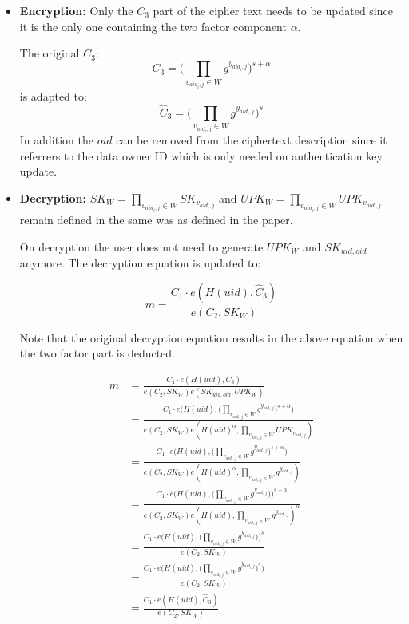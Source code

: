 \begin{itemize}
\item \textbf{Encryption:} 
Only the $C_3$ part of the cipher text needs to be updated since it is the only one containing the two factor component $\alpha$.

The original $C_3$:
$$
C_3 = \Big( \prod_{v_{aid_{i}, j}\in W} g^{y_{aid_{i}, j}} \Big)^{s + \alpha} 
$$
is adapted to:
$$
\widehat{C}_3 = \Big( \prod_{v_{aid_{i}, j}\in W} g^{y_{aid_{i}, j}} \Big)^s
$$ 
In addition the $oid$ can be removed from the ciphertext description since it referrers to the data owner ID which is only needed on authentication key update.

\item \textbf{Decryption:}
$SK_W = \prod_{v_{aid_i,j} \in W} SK_{v_{aid_i,j}}$ and $UPK_W = \prod_{v_{aid_i,j} \in W} UPK_{v_{aid_i,j}}$ remain defined in the same was as defined in the paper. 

On decryption the user does not need to generate $UPK_W$ and $SK_{uid, oid}$ anymore. The decryption equation is updated to:

$$
m = \frac{C_1 \cdotp e(H(uid), \widehat{C}_3)}{e(C_2, SK_W)}
$$

Note that the original decryption equation results in the above equation when the two factor part is deducted.

\begin{equation}
\begin{split}
m &= \frac{C_1 \cdotp e(H(uid), C_3)}{e(C_2, SK_W)e(SK_{uid, oid}, UPK_W)} \\
  &= \frac{C_1 \cdotp e\Big(H(uid), \Big( \prod_{v_{aid_{i}, j}\in W} g^{y_{aid_{i}, j}} \Big)^{s + \alpha} \Big)}{e(C_2, SK_W)e(H(uid)^\alpha, \prod_{v_{aid_i,j} \in W} UPK_{v_{aid_i,j}})} \\
  &= \frac{C_1 \cdotp e\Big(H(uid), \Big( \prod_{v_{aid_{i}, j}\in W} g^{y_{aid_{i}, j}} \Big)^{s + \alpha} \Big)}{e(C_2, SK_W)e(H(uid)^\alpha, \prod_{v_{aid_i,j} \in W} g^{y_{aid_i,j}})} \\
  &= \frac{C_1 \cdotp e\Big(H(uid), \Big( \prod_{v_{aid_{i}, j}\in W} g^{y_{aid_{i}, j}} \Big) \Big)^{s + \alpha}}{e(C_2, SK_W)e(H(uid), \prod_{v_{aid_i,j} \in W} g^{y_{aid_i,j}})^\alpha} \\
  &= \frac{C_1 \cdotp e\Big(H(uid), \Big( \prod_{v_{aid_{i}, j}\in W} g^{y_{aid_{i}, j}} \Big) \Big)^{s}}{e(C_2, SK_W)} \\
  &= \frac{C_1 \cdotp e\Big(H(uid), \Big( \prod_{v_{aid_{i}, j}\in W} g^{y_{aid_{i}, j}} \Big)^{s} \Big)}{e(C_2, SK_W)} \\
  &= \frac{C_1 \cdotp e(H(uid), \widehat{C}_3)}{e(C_2, SK_W)}
\end{split}
\label{eq:2faRemoval}
\end{equation}


\end{itemize}

